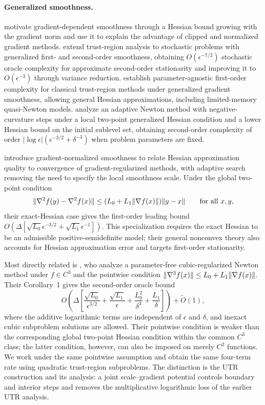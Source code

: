 \paragraph{Generalized smoothness.}
\citet{zhang2020clipping} motivate gradient-dependent smoothness
through a Hessian bound growing with the gradient norm and use it
to explain the advantage of clipped and normalized gradient methods.
\citet{xie2024trust} extend trust-region analysis to stochastic
problems with generalized first- and second-order smoothness,
obtaining $O(\epsilon^{-7/2})$ stochastic oracle complexity for
approximate second-order stationarity and improving it to
$O(\epsilon^{-3})$ through variance reduction.
\citet{diouane2026generalized} establish parameter-agnostic
first-order complexity for classical trust-region methods under
generalized gradient smoothness, allowing general Hessian
approximations, including limited-memory quasi-Newton models.
\citet{gratton2026fast} analyze an adaptive Newton method with
negative-curvature steps under a local two-point generalized
Hessian condition and a lower Hessian bound on the initial sublevel
set, obtaining second-order complexity of order
$|\log\epsilon|(\epsilon^{-3/2}+\delta^{-3})$ when problem
parameters are fixed.

\citet{semenov2026gradient} introduce gradient-normalized smoothness
to relate Hessian approximation quality to convergence of
gradient-regularized methods, with adaptive search removing the need
to specify the local smoothness scale.
Under the global two-point condition
\[
 \lVert\nabla^2f(y)-\nabla^2f(x)\rVert
 \le (L_0+L_1\lVert\nabla f(x)\rVert)\lVert y-x\rVert
 \qquad\text{for all }x,y,
\]
their exact-Hessian case gives the first-order leading
bound $O\!\left(\Delta[\sqrt{L_0}\epsilon^{-3/2}
+\sqrt{L_1}\epsilon^{-1}]\right)$.
This specialization requires the exact Hessian to be an admissible
positive-semidefinite model; their general nonconvex theory also
accounts for Hessian approximation error and targets first-order
stationarity.

Most directly related is \citet{fang2026parameter}, who analyze a
parameter-free cubic-regularized Newton method under
$f\in C^3$ and the pointwise condition
$\lVert\nabla^3 f(x)\rVert\le L_0+L_1\lVert\nabla f(x)\rVert$.
Their Corollary~1 gives the second-order oracle bound
\[
 O\!\left(\Delta\left[
 \frac{\sqrt{L_0}}{\epsilon^{3/2}}+
 \frac{\sqrt{L_1}}{\epsilon}+
 \frac{L_0^2}{\delta^3}+
 \frac{L_1}{\delta}\right]\right)+\widetilde O(1),
\]
where the additive logarithmic terms are independent of
$\epsilon$ and $\delta$, and inexact cubic subproblem solutions are
allowed.
Their pointwise condition is weaker than the corresponding global
two-point Hessian condition within the common $C^3$ class; the latter
condition, however, can also be imposed on merely $C^2$ functions.
We work under the same pointwise assumption and obtain the same
four-term rate using quadratic trust-region subproblems.
The distinction is the UTR construction and its analysis: a joint
scale--gradient potential controls boundary and interior steps and
removes the multiplicative logarithmic loss of the earlier UTR
analysis.

